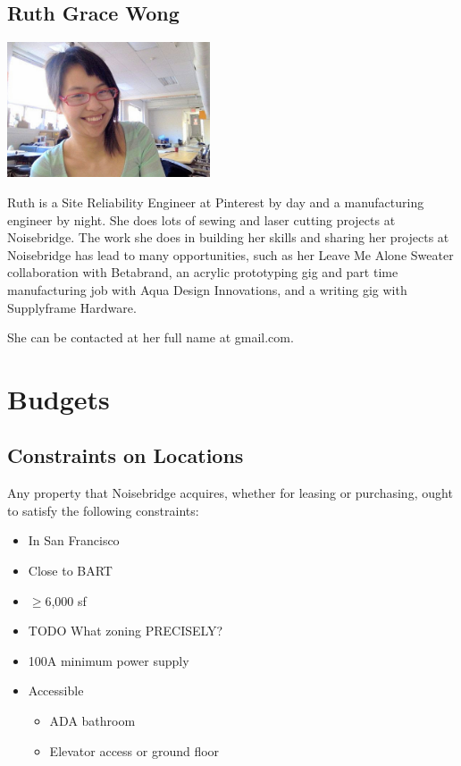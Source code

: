 \documentclass[12pt]{article}
\begin{document}
\subsection{Ruth Grace Wong}

\includegraphics[width=6cm]{ruth}

Ruth is a Site Reliability Engineer at Pinterest by day and a manufacturing engineer by night. She does lots of sewing and laser cutting projects at Noisebridge. The work she does in building her skills and sharing her projects at Noisebridge has lead to many opportunities, such as her Leave Me Alone Sweater collaboration with Betabrand, an acrylic prototyping gig and part time manufacturing job with Aqua Design Innovations, and a writing gig with Supplyframe Hardware.

She can be contacted at her full name at gmail.com.

\section{Budgets}

\subsection{Constraints on Locations}

Any property that Noisebridge acquires, whether for leasing or purchasing, ought to satisfy the following constraints:

\begin{itemize}
    \item In San Francisco
    \item Close to BART
    \item $\geq$6,000 sf
    \item TODO What zoning PRECISELY?
    \item 100A minimum power supply
    \item Accessible
        \begin{itemize}
            \item ADA bathroom
            \item Elevator access or ground floor
        \end{itemize}
\end{itemize}
\end{document}
